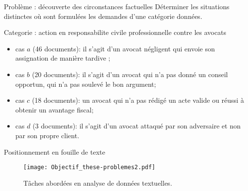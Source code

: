 \begin{frame}[c]{Problème : découverte des circonstances factuelles}
  Déterminer les situations distinctes où sont formulées les demandes d'une catégorie données.
    \begin{exampleblock}{Categorie : action en responsabilite civile professionnelle contre les avocats}
	\begin{itemize}
    \item cas $a$ (46 documents): il s'agit d'un avocat négligent qui envoie son assignation de manière tardive ; %
    \item cas $b$ (20 documents): il s'agit d'un avocat qui n'a pas donné un conseil opportun, qui n'a pas soulevé le bon argument;
    \item cas $c$ (18 documents): un avocat qui n'a pas rédigé un acte valide ou réussi à obtenir un avantage fiscal; %
    \item cas $d$ (3 documents): il s'agit d'un avocat attaqué par son adversaire et non par son propre client.
    \end{itemize}
    \end{exampleblock}
\end{frame}

\begin{frame}[c]{Positionnement en fouille de texte}	
	\begin{figure}[!htb]
		\texttt{[image: Objectif\_these-problemes2.pdf]}
		\caption{Tâches abordées en analyse de données textuelles.} \label{fig:intro:objectif-these-problemes}
	\end{figure}
\end{frame}

